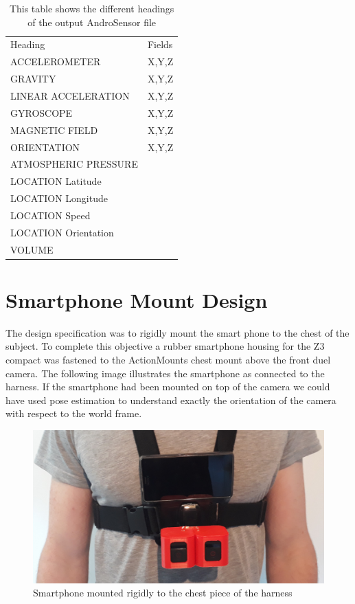 \begin{table}[!ht]
\centering
\captionsetup{width=0.8\linewidth, font=small}  
\caption{This table shows the different headings of the output AndroSensor file}
\label{Smartphone Data Headings}
\begin{tabular}{ll}
Heading               & Fields  \\
ACCELEROMETER       & X,Y,Z  \\
GRAVITY              & X,Y,Z \\
LINEAR ACCELERATION  & X,Y,Z\\
GYROSCOPE            & X,Y,Z \\
MAGNETIC FIELD       &  X,Y,Z\\
ORIENTATION          &  X,Y,Z\\
ATMOSPHERIC PRESSURE  &      \\
LOCATION Latitude     &       \\
LOCATION Longitude    &       \\
LOCATION Speed        &       \\
LOCATION Orientation  &       \\
VOLUME
\end{tabular}
\end{table}

\newpage
\section{Smartphone Mount Design}
The design specification was to rigidly mount the smart phone to the chest of the subject. To complete this objective a rubber smartphone housing for the Z3 compact was fastened to the ActionMounts chest mount above the front duel camera. The following image illustrates the smartphone as connected to the harness. If the smartphone had been mounted on top of the camera we could have used pose estimation to understand exactly the orientation of the camera with respect to the world frame.

\begin{figure}[!ht] 
\captionsetup{width=0.8\linewidth, font=small}  
\includegraphics[width=0.6\linewidth]{figures/pm.JPG}
\caption{Smartphone mounted rigidly to the chest piece of the harness}
\label{fig:pm}
\end{figure}

